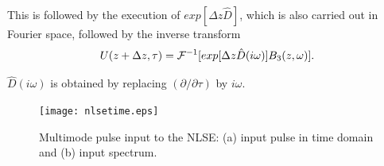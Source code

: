 This is followed by the execution of $exp[\Delta z \hat{D}]$, which is also
carried out in Fourier space, followed by the inverse transform
\begin{equation}
U(z + \Delta z,\tau) = {\cal{F}}^{-1}[exp[\Delta z \hat{D}(i\omega)]B_{3}(z,\omega)] .
\end{equation}

$\hat{D}(i\omega)$ is obtained by replacing $(\partial / \partial \tau)$
by $i \omega$.

\begin{figure}
\begin{center}
\texttt{[image: nlsetime.eps]}
\end{center}
\renewcommand{\baselinestretch}{1}
\small\normalsize
\begin{quote}
\caption[Multimode pulse input to the NLSE]{Multimode pulse input to the NLSE: (a) input pulse in time
domain and (b) input spectrum.}
\label{fig2.1}
\end{quote}
\end{figure}
\renewcommand{\baselinestretch}{2}
\small\normalsize

